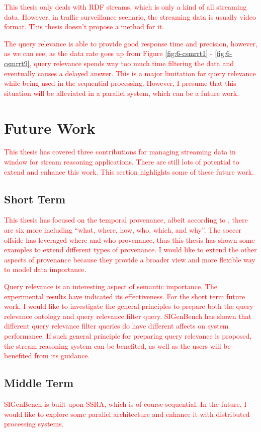 \textcolor{red}{
This thesis only deals with RDF streams, which is only a kind of all streaming data.
However, in traffic surveillance scenario, the streaming data is usually video format. 
This thesis doesn't propose a method for it. 
}

\textcolor{red}{
The query relevance is able to provide good response time and precision, however, as we can see, as the data rate goes up from Figure \ref{fig:6-csmrrt1} - \ref{fig:6-csmrrt9}, query relevance spends way too much time filtering the data and eventually causes a delayed answer. 
This is a major limitation for query relevance while being used in the sequential processing. 
However, I presume that this situation will be alleviated in a parallel system, which can be a future work. 
}
%
\section{Future Work}
\textcolor{red}{
This thesis has covered three contributions for managing streaming data in window for stream reasoning applications.
There are still lots of potential to extend and enhance this work. 
This section highlights some of these future work.
}
%
\subsection{Short Term}
\textcolor{red}{
This thesis has focused on the temporal provenance, albeit according to \cite{ram2009new}, there are six more including ``what, where, how, who, which, and why''.
The soccer offside has leveraged where and who provenance, thus this thesis has shown some examples to extend different types of provenance.
I would like to extend the other aspects of provenance because they provide a broader view and more flexible way to model data importance.
}

\textcolor{red}{
Query relevance is an interesting aspect of semantic importance.
The experimental results have indicated its effectiveness. 
For the short term future work, I would like to investigate the general principles to prepare both the query relevance ontology and query relevance filter query. 
SIGenBench has shown that different query relevance filter queries do have different affects on system performance. 
If such general principle for preparing query relevance is proposed, the stream reasoning system can be benefited, as well as the users will be benefited from its guidance. 
}
%
\subsection{Middle Term}
\textcolor{red}{
SIGenBench is built upon SSRA, which is of course sequential.
In the future, I would like to explore some parallel architecture and enhance it with distributed processing systems.
}

